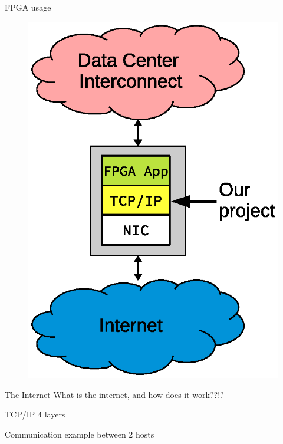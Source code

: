 \begin{frame}
FPGA usage
\begin{figure}
	\centering
\includegraphics[scale=0.5]{./background/fpga_usage.eps}
\end{figure}
\end{frame}

\begin{frame}
The Internet
What is the internet, and how does it work??!?
\end{frame}


\begin{frame}
TCP/IP 4 layers
\end{frame}


\begin{frame}
Communication example between 2 hosts
\end{frame}







